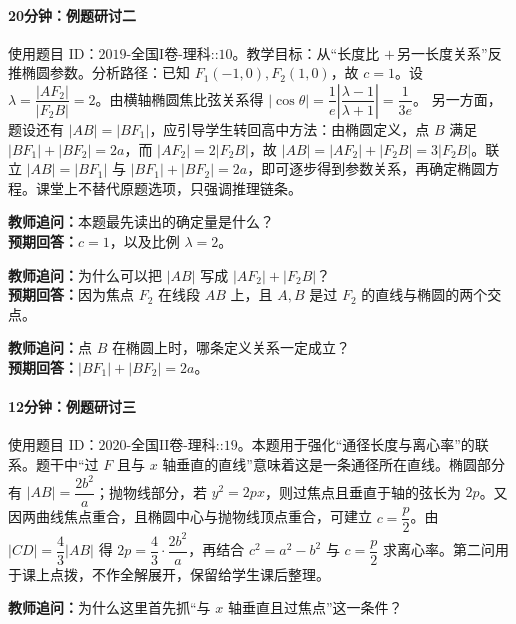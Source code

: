 \documentclass[UTF8,a4paper,11pt]{ctexart}
\begin{document}
\paragraph{20分钟：例题研讨二}

使用题目 ID：$\text{2019-全国I卷-理科::10}$。教学目标：从“长度比 $+\,$另一长度关系”反推椭圆参数。分析路径：已知 $F_1(-1,0),F_2(1,0)$，故 $c=1$。设 $\lambda=\dfrac{|AF_2|}{|F_2B|}=2$。由横轴椭圆焦比弦关系得
$\left|\cos\theta\right|=\dfrac{1}{e}\left|\dfrac{\lambda-1}{\lambda+1}\right|=\dfrac{1}{3e}$。
另一方面，题设还有 $|AB|=|BF_1|$，应引导学生转回高中方法：由椭圆定义，点 $B$ 满足 $|BF_1|+|BF_2|=2a$，而 $|AF_2|=2|F_2B|$，故 $|AB|=|AF_2|+|F_2B|=3|F_2B|$。联立 $|AB|=|BF_1|$ 与 $|BF_1|+|BF_2|=2a$，即可逐步得到参数关系，再确定椭圆方程。课堂上不替代原题选项，只强调推理链条。

\noindent\textbf{教师追问：}本题最先读出的确定量是什么？\\

\textbf{预期回答：}$c=1$，以及比例 $\lambda=2$。\par

\noindent\textbf{教师追问：}为什么可以把 $|AB|$ 写成 $|AF_2|+|F_2B|$？\\

\textbf{预期回答：}因为焦点 $F_2$ 在线段 $AB$ 上，且 $A,B$ 是过 $F_2$ 的直线与椭圆的两个交点。\par

\noindent\textbf{教师追问：}点 $B$ 在椭圆上时，哪条定义关系一定成立？\\

\textbf{预期回答：}$|BF_1|+|BF_2|=2a$。\par

\paragraph{12分钟：例题研讨三}

使用题目 ID：$\text{2020-全国II卷-理科::19}$。本题用于强化“通径长度与离心率”的联系。题干中“过 $F$ 且与 $x$ 轴垂直的直线”意味着这是一条通径所在直线。椭圆部分有 $|AB|=\dfrac{2b^2}{a}$；抛物线部分，若 $y^2=2px$，则过焦点且垂直于轴的弦长为 $2p$。又因两曲线焦点重合，且椭圆中心与抛物线顶点重合，可建立 $c=\dfrac p2$。由 $|CD|=\dfrac43|AB|$ 得
$2p=\dfrac43\cdot \dfrac{2b^2}{a}$，再结合 $c^2=a^2-b^2$ 与 $c=\dfrac p2$ 求离心率。第二问用于课上点拨，不作全解展开，保留给学生课后整理。

\noindent\textbf{教师追问：}为什么这里首先抓“与 $x$ 轴垂直且过焦点”这一条件？\\
\end{document}
